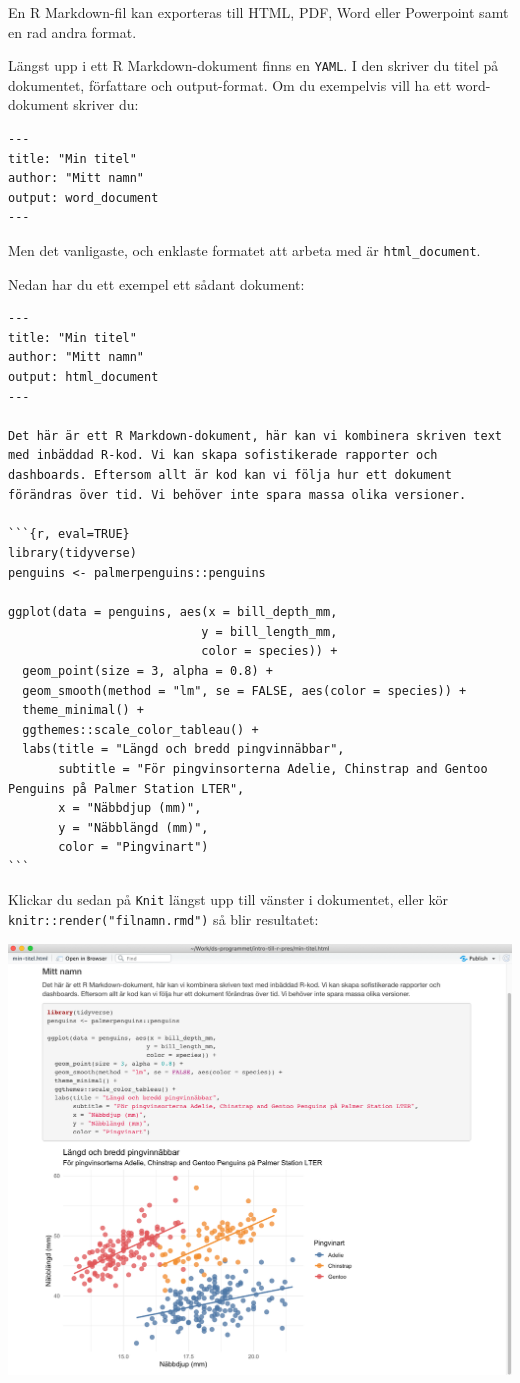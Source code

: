 \documentclass[
]{book}
\begin{document}
En R Markdown-fil kan exporteras till HTML, PDF, Word eller Powerpoint samt en rad andra format.

Längst upp i ett R Markdown-dokument finns en \texttt{YAML}. I den skriver du titel på dokumentet, författare och output-format. Om du exempelvis vill ha ett word-dokument skriver du:

\begin{verbatim}
---
title: "Min titel"
author: "Mitt namn"
output: word_document
---
\end{verbatim}

Men det vanligaste, och enklaste formatet att arbeta med är \texttt{html\_document}.

Nedan har du ett exempel ett sådant dokument:

\begin{verbatim}
---
title: "Min titel"
author: "Mitt namn"
output: html_document
---

Det här är ett R Markdown-dokument, här kan vi kombinera skriven text med inbäddad R-kod. Vi kan skapa sofistikerade rapporter och dashboards. Eftersom allt är kod kan vi följa hur ett dokument förändras över tid. Vi behöver inte spara massa olika versioner. 

```{r, eval=TRUE}
library(tidyverse)
penguins <- palmerpenguins::penguins

ggplot(data = penguins, aes(x = bill_depth_mm,
                           y = bill_length_mm,
                           color = species)) +
  geom_point(size = 3, alpha = 0.8) +
  geom_smooth(method = "lm", se = FALSE, aes(color = species)) +
  theme_minimal() +
  ggthemes::scale_color_tableau() +
  labs(title = "Längd och bredd pingvinnäbbar",
       subtitle = "För pingvinsorterna Adelie, Chinstrap and Gentoo Penguins på Palmer Station LTER",
       x = "Näbbdjup (mm)",
       y = "Näbblängd (mm)",
       color = "Pingvinart")
```
\end{verbatim}

Klickar du sedan på \texttt{Knit} längst upp till vänster i dokumentet, eller kör \texttt{knitr::render("filnamn.rmd")} så blir resultatet:

\includegraphics{images/rmd-knitted.png}
\end{document}
